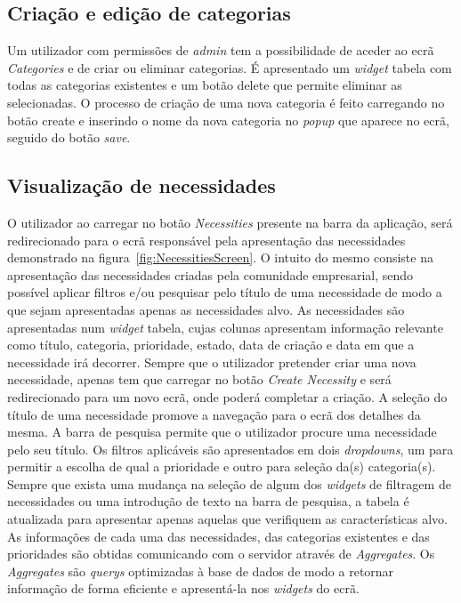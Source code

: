 \subsection{Criação e edição de categorias}\label{subsec:implementacao:categories}

Um utilizador com permissões de \textit{admin} tem a possibilidade de aceder ao ecrã \textit{Categories} e de criar ou eliminar categorias. 
É apresentado um \textit{widget} tabela com todas as categorias existentes e um botão delete que permite eliminar as selecionadas.
O processo de criação de uma nova categoria é feito carregando no botão create e inserindo o nome da nova categoria no \textit{popup} que aparece no ecrã, seguido do botão \textit{save}.


\subsection{Visualização de necessidades}\label{subsec:implementacao:necessities}
O utilizador ao carregar no botão \textit{Necessities} presente na barra da aplicação, será redirecionado para o ecrã responsável pela apresentação das necessidades demonstrado na figura~\ref{fig:NecessitiesScreen}. 
O intuito do mesmo consiste na apresentação das necessidades criadas pela comunidade empresarial, sendo possível aplicar filtros e/ou pesquisar pelo título de uma necessidade de modo a que sejam apresentadas apenas as necessidades alvo.
As necessidades são apresentadas num \textit{widget} tabela, cujas colunas apresentam informação relevante como título, categoria, prioridade, estado, data de criação e data em que a necessidade irá decorrer. Sempre que o utilizador pretender criar uma nova necessidade, apenas tem que carregar no botão \textit{Create Necessity} e será redirecionado para um novo ecrã, onde poderá completar a criação.
A seleção do título de uma necessidade promove a navegação para o ecrã dos detalhes da mesma.
A barra de pesquisa permite que o utilizador procure uma necessidade pelo seu título.
Os filtros aplicáveis são apresentados em dois \textit{dropdowns}, um para permitir a escolha de qual a prioridade e outro para seleção da(s) categoria(s).
Sempre que exista uma mudança na seleção de algum dos \textit{widgets} de filtragem de necessidades ou uma introdução de texto na barra de pesquisa, a tabela é atualizada para apresentar apenas aquelas que verifiquem as características alvo. 
As informações de cada uma das necessidades, das categorias existentes e das prioridades são obtidas comunicando com o servidor através de \textit{Aggregates}. 
Os \textit{Aggregates} são \textit{querys} optimizadas à base de dados de modo a retornar informação de forma eficiente e apresentá-la nos \textit{widgets} do ecrã.

